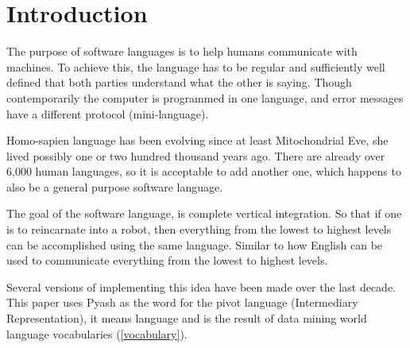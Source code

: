 \maketitle{}
\section{Introduction}

The purpose of software languages is to help humans communicate with machines. 
To achieve this, the language has to be regular and sufficiently well defined
that both parties understand what the other is saying. Though contemporarily the
computer is programmed in one language, and error messages have a different
protocol (mini-language). 

Homo-sapien language has been evolving since at least Mitochondrial Eve, she lived
possibly one or two hundred thousand years ago. There are already over 6,000 human languages, so it
is acceptable to add another one, which happens to also be a general purpose
software language. 

The goal of the software language, is complete vertical
integration. So that if one is to reincarnate into a robot, then
everything from the lowest to highest levels can be accomplished using the 
same language.  Similar to how English can be used to
communicate everything from the lowest to highest levels. 

Several versions of implementing this idea have been made over the last decade. This paper
uses Pyash as the word for the pivot language (Intermediary Representation), 
it means language and is the result of data mining world language vocabularies
(\ref{vocabulary}).
 
